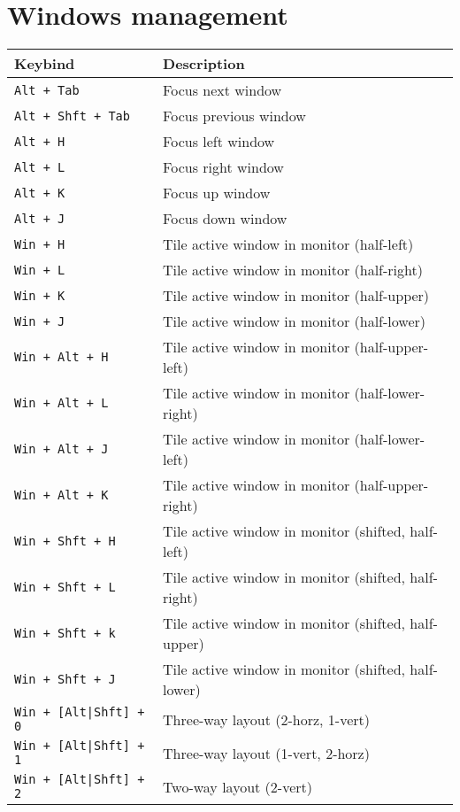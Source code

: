 \documentclass[letterpaper,12pt]{article}
\begin{document}
\section*{Windows management}
\begin{table}[H]
  \begin{tabular}{|C{5cm}|L{10cm}|}
    \hline
    \textbf{Keybind} & \textbf{Description} \\
    \hline
    {\tt Alt + Tab} & Focus next window \\
    {\tt Alt + Shft + Tab} & Focus previous window \\
    {\tt Alt + H} & Focus left window \\
    {\tt Alt + L} & Focus right window \\
    {\tt Alt + K} & Focus up window \\
    {\tt Alt + J} & Focus down window \\
    \hline
    {\tt Win + H} & Tile active window in monitor (half-left) \\
    {\tt Win + L} & Tile active window in monitor (half-right) \\
    {\tt Win + K} & Tile active window in monitor (half-upper) \\
    {\tt Win + J} & Tile active window in monitor (half-lower) \\
    {\tt Win + Alt + H} & Tile active window in monitor (half-upper-left) \\
    {\tt Win + Alt + L} & Tile active window in monitor (half-lower-right) \\
    {\tt Win + Alt + J} & Tile active window in monitor (half-lower-left) \\
    {\tt Win + Alt + K} & Tile active window in monitor (half-upper-right) \\
    {\tt Win + Shft + H} & Tile active window in monitor (shifted, half-left) \\
    {\tt Win + Shft + L} & Tile active window in monitor (shifted, half-right) \\
    {\tt Win + Shft + k} & Tile active window in monitor (shifted, half-upper) \\
    {\tt Win + Shft + J} & Tile active window in monitor (shifted, half-lower) \\
    \hline
    {\tt Win + [Alt|Shft] + 0} & Three-way layout (2-horz, 1-vert) \\
    {\tt Win + [Alt|Shft] + 1} & Three-way layout (1-vert, 2-horz) \\
    {\tt Win + [Alt|Shft] + 2} & Two-way layout (2-vert) \\

\end{tabular}
\end{table}
\end{document}
